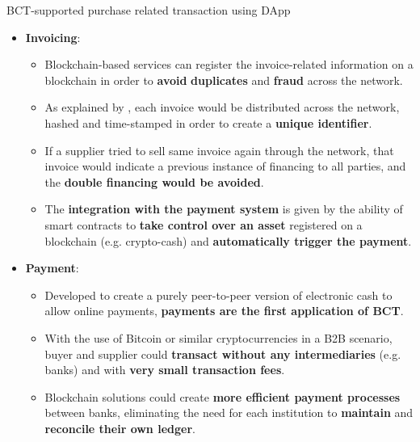 \documentclass[11pt]{beamer}
\begin{document}
\begin{frame}[allowframebreaks]{BCT-supported purchase related transaction using DApp}
\begin{itemize}
\item \textbf{Invoicing}:
\begin{itemize}
	\item Blockchain-based services can register the invoice-related information on a blockchain in order to \textbf{avoid} \textbf{duplicates} and \textbf{fraud} across the network.
	\item As explained by \cite{hofmannstrewebosia}, each invoice would be distributed across the network, hashed and time-stamped in order to create a \textbf{unique identifier}.
	\item If a supplier tried to sell same invoice again through the network, that invoice would indicate a previous instance of financing to all parties, and the \textbf{double financing would be avoided}.
	\item The \textbf{integration with the payment system} is given by the ability of smart contracts to \textbf{take control over an asset} registered on a blockchain (e.g. crypto-cash) and \textbf{automatically trigger the payment}.
\end{itemize}

\item \textbf{Payment}: 
\begin{itemize}
	\item Developed to create a purely peer-to-peer version of electronic
cash to allow online payments, \textbf{payments are the first application of BCT}.
	\item With the use of Bitcoin or similar cryptocurrencies in a B2B scenario, buyer and supplier could \textbf{transact without any intermediaries} (e.g. banks) and with \textbf{very small transaction fees}.
	\item Blockchain solutions could create \textbf{more efficient payment processes} between banks, eliminating the need for each institution to \textbf{maintain} and \textbf{reconcile their own ledger}.
\end{itemize}

\end{itemize}

\end{frame}
\end{document}
